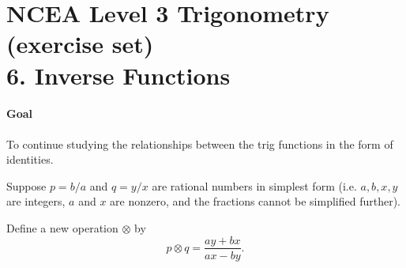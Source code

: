 \documentclass[answers]{exam}
\DeclareMathOperator{\arcversin}{arcversin}
\begin{document}
\section*{NCEA Level 3 Trigonometry (exercise set)\\6. Inverse Functions}
\paragraph{Goal} To continue studying the relationships between the trig functions in the form of identities.

\begin{questions}
  \question
  \question
  \question Suppose $ p = b/a $ and $ q = y/x $ are rational numbers in simplest form (i.e. $ a, b, x, y $ are integers, $ a $ and $ x $ are nonzero,
            and the fractions cannot be simplified further).

            Define a new operation $ \otimes $ by
            \begin{displaymath}
              p \otimes q = \frac{ay + bx}{ax - by}.
            \end{displaymath}
    \begin{parts}

\end{parts}
\end{questions}
\end{document}
